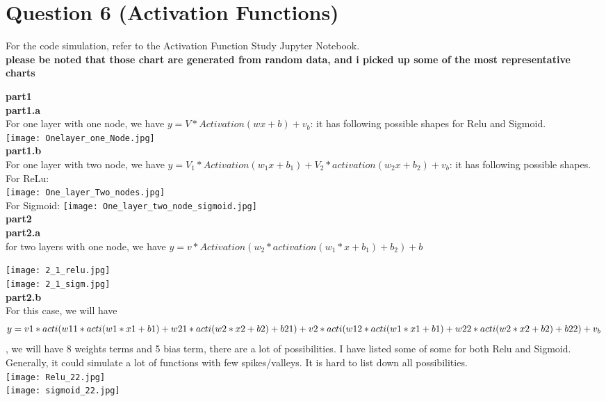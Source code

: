 \documentclass{article}
\begin{document}
\section{Question 6 (Activation Functions)}
For the code simulation, refer to the Activation Function Study Jupyter Notebook.\\
\textbf{please be noted that those chart are generated from random data, and i picked up some of the most representative charts}

\textbf{part1} \\
\textbf{part1.a} \\
For one layer with one node, we have $y=V*Activation(wx+b)+v_b$: it has following possible shapes for Relu and Sigmoid. \\
\texttt{[image: Onelayer\_one\_Node.jpg]}\\
\textbf{part1.b} \\
For one layer with two node, we have $y=V_1*Activation(w_1x+b_1)+V_2*activation(w_2x+b_2)+v_b$: it has following possible shapes. \\
For ReLu: \\
\texttt{[image: One\_layer\_Two\_nodes.jpg]} \\
For Sigmoid: 
\texttt{[image: One\_layer\_two\_node\_sigmoid.jpg]} \\
\textbf{part2} \\
\textbf{part2.a} \\
for two layers with one node, we have $y=v*Activation(w_2*activation(w_1*x+b_1)+b_2)+b$

\texttt{[image: 2\_1\_relu.jpg]} \\
\texttt{[image: 2\_1\_sigm.jpg]} \\
\textbf{part2.b} \\
For this case, we will have $$
y=v1*acti(w11*acti(w1*x1+b1)+ \\ 
w21*acti(w2*x2+b2)+b21)+v2*acti(w12*acti(w1*x1+b1) \\
+ w22*acti(w2*x2+b2)+b22)+v_b
$$, 
we will have 8 weights terms and 5 bias term, there are a lot of possibilities. I have listed some of some for both Relu and Sigmoid.  \\
Generally, it could simulate a lot of functions with few spikes/valleys. It is hard to list down all possibilities. \\ 
\texttt{[image: Relu\_22.jpg]} \\
\texttt{[image: sigmoid\_22.jpg]} \\
\end{document}
